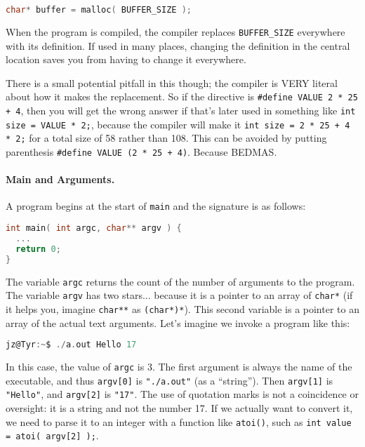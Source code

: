 \begin{lstlisting}[language=C]
char* buffer = malloc( BUFFER_SIZE );
\end{lstlisting}

When the program is compiled, the compiler replaces \texttt{BUFFER\_SIZE} everywhere with its definition. If used in many places, changing the definition in the central location saves you from having to change it everywhere.

There is a small potential pitfall in this though; the compiler is VERY literal about how it makes the replacement. So if the directive is \texttt{\#define VALUE 2 * 25 + 4}, then you will get the wrong answer if that's later used in something like \texttt{int size = VALUE * 2;}, because the compiler will make it \texttt{int size = 2 * 25 + 4 * 2;} for a total size of 58 rather than 108. This can be avoided by putting parenthesis \texttt{\#define VALUE (2 * 25 + 4)}. Because BEDMAS.

\paragraph{Main and Arguments.} 
A program begins at the start of \texttt{main} and the signature is as follows:

\begin{lstlisting}[language=C]
int main( int argc, char** argv ) {
  ...
  return 0;
}
\end{lstlisting}

The variable \texttt{argc} returns the count of the number of arguments to the program. The variable \texttt{argv} has two stars... because it is a pointer to an array of \texttt{char*} (if it helps you, imagine \texttt{char**} as \texttt{(char*)*}). This second variable is a pointer to an array of the actual text arguments. Let's imagine we invoke a program like this:

\begin{lstlisting}[language=C]
jz@Tyr:~$ ./a.out Hello 17
\end{lstlisting}

In this case, the value of \texttt{argc} is 3. The first argument is always the name of the executable, and thus \texttt{argv[0]} is \texttt{"./a.out"} (as a ``string''). Then \texttt{argv[1]} is \texttt{"Hello"}, and \texttt{argv[2]} is \texttt{"17"}.  The use of quotation marks is not a coincidence or oversight: it is a string and not the number 17. If we actually want to convert it, we need to parse it to an integer with a function like \texttt{atoi()}, such as \texttt{int value = atoi( argv[2] );}.

